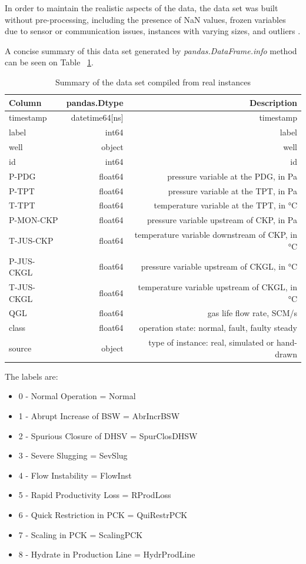 \documentclass{article}
\begin{document}
In order to maintain the realistic aspects of the data, the data set was built without pre-processing, including the presence of NaN values, frozen variables due to sensor or communication issues, instances with varying sizes, and outliers \parencite{revvargas2019}.

A concise summary of this data set generated by \emph{pandas.DataFrame.info} method can be seen on Table ~\ref{tab:widgets}.

\begin{table}
\centering
\begin{tabular}{l|r|r}

Column & pandas.Dtype & Description\\\hline
timestamp & datetime64[ns] & timestamp \\
label & int64 & label \\        
well & object & well \\       
id & int64 & id \\        
P-PDG & float64 & pressure variable at the PDG, in Pa \\      
P-TPT & float64 & pressure variable at the TPT, in Pa \\     
T-TPT & float64 & temperature variable at the TPT, in °C \\      
P-MON-CKP & float64 & pressure variable upstream of CKP, in Pa \\      
T-JUS-CKP & float64 & temperature variable downstream of CKP, in °C \\      
P-JUS-CKGL & float64 & pressure variable upstream of CKGL, in °C \\       
T-JUS-CKGL & float64 & temperature variable upstream of CKGL,  in °C\\     
QGL & float64 & gas life flow rate, SCM/s\\      
class & float64 & operation state: normal, fault, faulty steady \\   
source & object & type of instance: real, simulated or hand-drawn \\     

\end{tabular}
\caption{\label{tab:widgets}Summary of the data set compiled from real instances}
\end{table}


The labels are:

\begin{itemize}
\item 0 - Normal Operation = Normal
\item 1 - Abrupt Increase of BSW = AbrIncrBSW
\item 2 - Spurious Closure of DHSV = SpurClosDHSW
\item 3 - Severe Slugging = SevSlug
\item 4 - Flow Instability = FlowInst
\item 5 - Rapid Productivity Loss = RProdLoss
\item 6 - Quick Restriction in PCK = QuiRestrPCK
\item 7 - Scaling in PCK = ScalingPCK
\item 8 - Hydrate in Production Line = HydrProdLine
\end{itemize}
\end{document}
